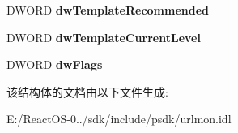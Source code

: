 \begin{DoxyCompactItemize}
\mbox{\label{struct_i_internet_zone_manager_1_1___z_o_n_e_a_t_t_r_i_b_u_t_e_s_a0204cc541ca440b811b1385eb73b64b0}} 
D\+W\+O\+RD {\bfseries dw\+Template\+Recommended}
\item 
\mbox{\label{struct_i_internet_zone_manager_1_1___z_o_n_e_a_t_t_r_i_b_u_t_e_s_a9c206c772131eaf85596531ee087ec4a}} 
D\+W\+O\+RD {\bfseries dw\+Template\+Current\+Level}
\item 
\mbox{\label{struct_i_internet_zone_manager_1_1___z_o_n_e_a_t_t_r_i_b_u_t_e_s_a5ddaaeb866b1c0699a81c1292a739005}} 
D\+W\+O\+RD {\bfseries dw\+Flags}
\end{DoxyCompactItemize}


该结构体的文档由以下文件生成\+:\begin{DoxyCompactItemize}
\item 
E\+:/\+React\+O\+S-\/0../sdk/include/psdk/urlmon.\+idl\end{DoxyCompactItemize}
